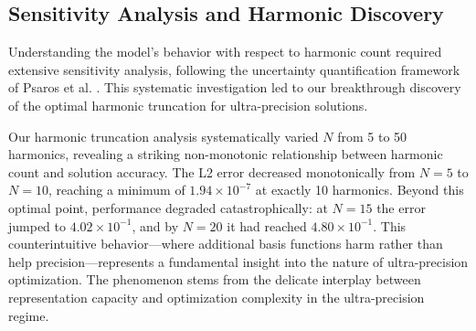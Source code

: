 \subsection{Sensitivity Analysis and Harmonic Discovery}
\label{subsec:sensitivity_results}

Understanding the model's behavior with respect to harmonic count required extensive sensitivity analysis, following the uncertainty quantification framework of Psaros et al. \cite{psaros2023uncertainty}. This systematic investigation led to our breakthrough discovery of the optimal harmonic truncation for ultra-precision solutions.

Our harmonic truncation analysis systematically varied $N$ from 5 to 50 harmonics, revealing a striking non-monotonic relationship between harmonic count and solution accuracy. The L2 error decreased monotonically from $N=5$ to $N=10$, reaching a minimum of $1.94 \times 10^{-7}$ at exactly 10 harmonics. Beyond this optimal point, performance degraded catastrophically: at $N=15$ the error jumped to $4.02 \times 10^{-1}$, and by $N=20$ it had reached $4.80 \times 10^{-1}$. This counterintuitive behavior—where additional basis functions harm rather than help precision—represents a fundamental insight into the nature of ultra-precision optimization. The phenomenon stems from the delicate interplay between representation capacity and optimization complexity in the ultra-precision regime.

